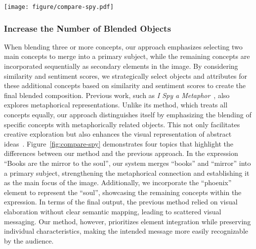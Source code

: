 \begin{figure*}[t]
  \centering
  \texttt{[image: figure/compare-spy.pdf]}
  \caption{The results generated by our approach when processing more than two concepts. The outcomes presented are in line with the topics explored in \textit{I Spy a Metaphor}~\cite{chakrabarty-etal-2023-spy}.}
  \label{fig:compare-spy}
\end{figure*}



\subsubsection{Increase the Number of Blended Objects}

When blending three or more concepts, our approach emphasizes selecting two main concepts to merge into a primary subject, while the remaining concepts are incorporated sequentially as secondary elements in the image.
By considering similarity and sentiment scores, we strategically select objects and attributes for these additional concepts based on similarity and sentiment scores to create the final blended composition.
Previous work, such as \textit{I Spy a Metaphor}~\cite{chakrabarty-etal-2023-spy}, also explores metaphorical representations.
Unlike its method, which treats all concepts equally, our approach distinguishes itself by emphasizing the blending of specific concepts with metaphorically related objects.
This not only facilitates creative exploration but also enhances the visual representation of abstract ideas~\cite{8eb8812e-2a0d-3ce5-ba0f-6a9667472863}.
Figure~\ref{fig:compare-spy} demonstrates four topics that highlight the differences between our method and the previous approach.
In the expression ``Books are the mirror to the soul'', our system merges ``books'' and ``mirror'' into a primary subject, strengthening the metaphorical connection and establishing it as the main focus of the image. 
Additionally, we incorporate the ``phoenix'' element to represent the ``soul'', showcasing the remaining concepts within the expression.
In terms of the final output, the previous method relied on visual elaboration without clear semantic mapping, leading to scattered visual messaging. 
Our method, however, prioritizes element integration while preserving individual characteristics, making the intended message more easily recognizable by the audience.






